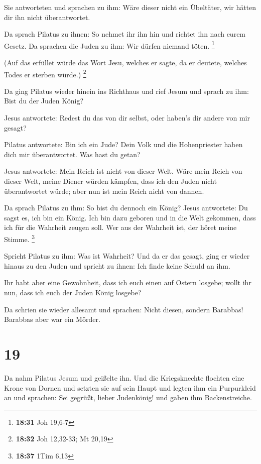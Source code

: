  Sie antworteten und sprachen zu ihm: Wäre dieser nicht
ein Übeltäter, wir hätten dir ihn nicht überantwortet.

 Da sprach Pilatus zu ihnen: So nehmet ihr ihn hin und
richtet ihn nach eurem Gesetz. Da sprachen die Juden zu ihm: Wir dürfen
niemand töten. \footnote{\textbf{18:31} Joh 19,6-7}

 (Auf das erfüllet würde das Wort Jesu, welches er sagte,
da er deutete, welches Todes er sterben würde.) \footnote{\textbf{18:32}
  Joh 12,32-33; Mt 20,19}

 Da ging Pilatus wieder hinein ins Richthaus und rief
Jesum und sprach zu ihm: Bist du der Juden König?

 Jesus antwortete: Redest du das von dir selbst, oder
haben's dir andere von mir gesagt?

 Pilatus antwortete: Bin ich ein Jude? Dein Volk und die
Hohenpriester haben dich mir überantwortet. Was hast du getan?

 Jesus antwortete: Mein Reich ist nicht von dieser Welt.
Wäre mein Reich von dieser Welt, meine Diener würden kämpfen, dass ich
den Juden nicht überantwortet würde; aber nun ist mein Reich nicht von
dannen.

 Da sprach Pilatus zu ihm: So bist du dennoch ein König?
Jesus antwortete: Du sagst es, ich bin ein König. Ich bin dazu geboren
und in die Welt gekommen, dass ich für die Wahrheit zeugen soll. Wer aus
der Wahrheit ist, der höret meine Stimme. \footnote{\textbf{18:37} 1Tim
  6,13}

 Spricht Pilatus zu ihm: Was ist Wahrheit? Und da er das
gesagt, ging er wieder hinaus zu den Juden und spricht zu ihnen: Ich
finde keine Schuld an ihm.

 Ihr habt aber eine Gewohnheit, dass ich euch einen auf
Ostern losgebe; wollt ihr nun, dass ich euch der Juden König losgebe?

 Da schrien sie wieder allesamt und sprachen: Nicht
diesen, sondern Barabbas! Barabbas aber war ein Mörder.

\hypertarget{section-18}{%
\section{19}\label{section-18}}

 Da nahm Pilatus Jesum und geißelte ihn. 
Und die Kriegsknechte flochten eine Krone von Dornen und setzten sie auf
sein Haupt und legten ihm ein Purpurkleid an  und
sprachen: Sei gegrüßt, lieber Judenkönig! und gaben ihm Backenstreiche.

